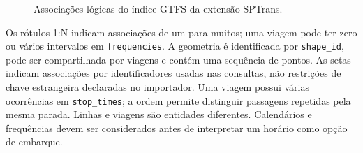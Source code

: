 \documentclass[12pt,oneside,a4paper,brazil,chapter=TITLE]{abntex2}
\begin{document}
\begin{apendicesenv}
\begin{figure}[H]\centering
{}
\caption{Associações lógicas do índice GTFS da extensão SPTrans.}\label{fig:banco-mbm}
\end{figure}
Os rótulos 1:N indicam associações de um para muitos; uma viagem pode ter zero ou vários intervalos em \texttt{frequencies}. A geometria é identificada por \texttt{shape\_id}, pode ser compartilhada por viagens e contém uma sequência de pontos. As setas indicam associações por identificadores usadas nas consultas, não restrições de chave estrangeira declaradas no importador. Uma viagem possui várias ocorrências em \texttt{stop\_times}; a ordem permite distinguir passagens repetidas pela mesma parada. Linhas e viagens são entidades diferentes. Calendários e frequências devem ser considerados antes de interpretar um horário como opção de embarque.


\end{apendicesenv}
\end{document}
